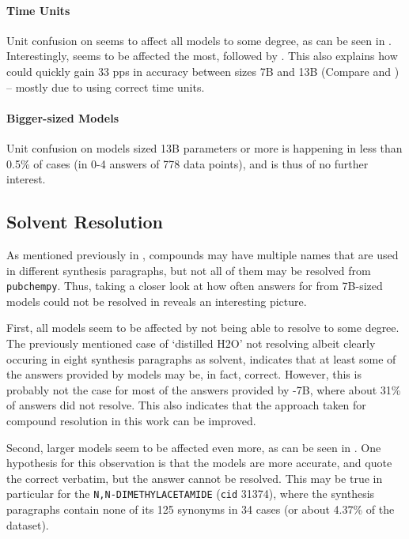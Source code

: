 \paragraph{Time Units}
Unit confusion on \ttime seems to affect all models to some degree, as can be seen in .
Interestingly,  seems to be affected the most, followed by .
This also explains how  could quickly gain 33 \glspl{pp} in accuracy between sizes 7B and 13B (Compare  and ) -- mostly due to using correct time units.

\paragraph{Bigger-sized Models}
Unit confusion on models sized 13B parameters or more is happening in less than 0.5\% of cases (in 0-4 answers of 778 data points), and is thus of no further interest.




\subsection{Solvent Resolution}\label{sub:solv}
As mentioned previously in , compounds may have multiple names that are used in different synthesis paragraphs, but not all of them may be resolved from \texttt{pubchempy}.
Thus, taking a closer look at how often answers for \tsolv from 7B-sized models could not be resolved in  reveals an interesting picture.

First, all models seem to be affected by not being able to resolve \tsolv to some degree.
The previously mentioned case of `distilled H2O' not resolving albeit clearly occuring in eight synthesis paragraphs as solvent, indicates that at least some of the answers provided by models may be, in fact, correct.
However, this is probably not the case for most of the answers provided by -7B, where about 31\% of answers did not resolve.
This also indicates that the approach taken for compound resolution in this work can be improved.

Second, larger models seem to be affected even more, as can be seen in .
One hypothesis for this observation is that the models are more accurate, and quote the correct \tsolv verbatim, but the answer cannot be resolved.
This may be true in particular for the \tsolv \texttt{N,N-DIMETHYLACETAMIDE} (\texttt{cid} 31374), where the synthesis paragraphs contain none of its 125 synonyms in 34 cases (or about 4.37\% of the dataset).

